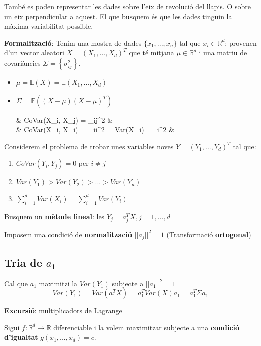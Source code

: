 \documentclass[a4paper]{article}
\begin{document}
També es poden representar les dades sobre l'eix de revolució del llapis. O sobre un eix perpendicular a aquest. El que busquem és que les dades tinguin la màxima variabilitat possible.

\textbf{Formalització}: Tenim una mostra de dades $\{x_1, ..., x_n\}$ tal que $x_i \in \mathbb{R}^d$; provenen d'un vector aleatori $X = (X_1, ..., X_d)^T$ que té mitjana $\mu \in \mathbb{R}^d$ i una matriu de covariàncies $\Sigma = \left\{ \sigma_{ij}^2 \right\}$.

\begin{itemize}
	\item $\mu = \mathbb{E}(X) = \mathbb{E}(X_1, ..., X_d)$
	\item $\Sigma = \mathbb{E}\left((X - \mu)(X-\mu)^T\right)$
	
	\begin{flalign*}
	 & CoVar(X_i, X_j) = \sigma_{ij}^2  &\\
 & CoVar(X_i, X_i) = \sigma_{ii}^2 = Var(X_i) =\sigma_i^2 &
	\end{flalign*}
\end{itemize}

Considerem el problema de trobar unes variables noves $Y = (Y_1, ..., Y_d)^T$ tal que:

\begin{enumerate}
	\item $CoVar(Y_i, Y_j) = 0$ per $i \ne j$
	\item $Var(Y_1) > Var(Y_2) > ... > Var(Y_d)$
	\item $\sum_{i=1}^d Var(X_i) = \sum_{i=1}^d Var(Y_i)$
\end{enumerate}

Busquem un \textbf{mètode lineal}: les $Y_j = a_j^TX, j=1,...,d$

Imposem una condició de \textbf{normalització} $||a_j||^2 = 1$ 
(Transformació \textbf{ortogonal})

\subsection{Tria de $a_1$}
Cal que $a_1$ maximitzi la $Var(Y_1)$ subjecte a $||a_1||^2=1$
$$ Var(Y_1) = Var(a_1^TX) = a_1^TVar(X)a_1 = a_1^T\Sigma a_1 $$

\textbf{Excursió}: multiplicadors de Lagrange

Sigui $f:\mathbb{R}^d \rightarrow \mathbb{R}$ diferenciable i la volem maximitzar subjecte a una \textbf{condició d'igualtat} $g(x_1, ..., x_d) = c$.
\end{document}
